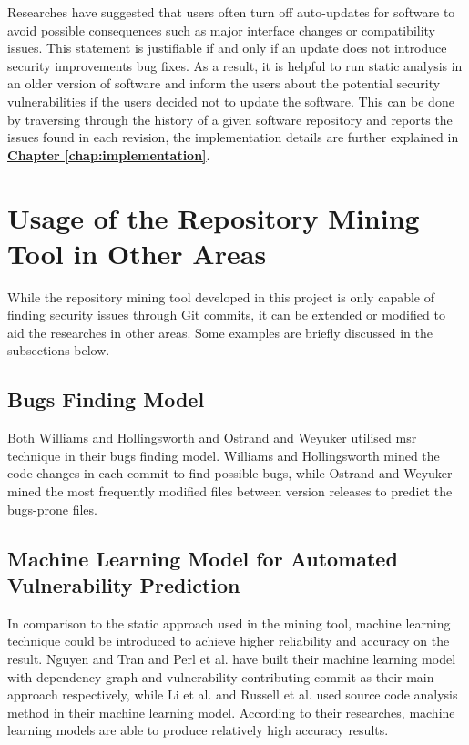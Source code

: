 \documentclass[12pt, a4paper]{report}
\begin{document}
Researches have suggested that users often turn off auto-updates for software \cite{fagan_2015,
mathur_2017} to avoid possible consequences such as major interface changes or compatibility issues.
This statement is justifiable if and only if an update does not introduce security improvements bug
fixes. As a result, it is helpful to run static analysis in an older version of software and inform
the users about the potential security vulnerabilities if the users decided not to update the
software. This can be done by traversing through the history of a given software repository and
reports the issues found in each revision, the implementation details are further explained in
\hyperref[chap:implementation]{\textbf{Chapter \ref*{chap:implementation}}}.

\section{Usage of the Repository Mining Tool in Other Areas}
While the repository mining tool developed in this project is only capable of finding security
issues through Git commits, it can be extended or modified to aid the researches in other areas.
Some examples are briefly discussed in the subsections below.

\subsection{Bugs Finding Model}
Both Williams and Hollingsworth \cite{williams_2005} and Ostrand and Weyuker \cite{ostrand_2004}
utilised \acrshort{msr} technique in their bugs finding model. Williams and Hollingsworth mined the
code changes in each commit to find possible bugs, while Ostrand and Weyuker mined the most
frequently modified files between version releases to predict the bugs-prone files.

\subsection{Machine Learning Model for Automated Vulnerability Prediction}
In comparison to the static approach used in the mining tool, machine learning technique could be
introduced to achieve higher reliability and accuracy on the result. Nguyen and Tran
\cite{nguyen_2010} and Perl et al. \cite{perl_2015} have built their machine learning model with
dependency graph and vulnerability-contributing commit as their main approach respectively, while Li
et al. \cite{li_2016} and Russell et al. \cite{russell_2018} used source code analysis method in
their machine learning model. According to their researches, machine learning models are able to
produce relatively high accuracy results.
\end{document}
